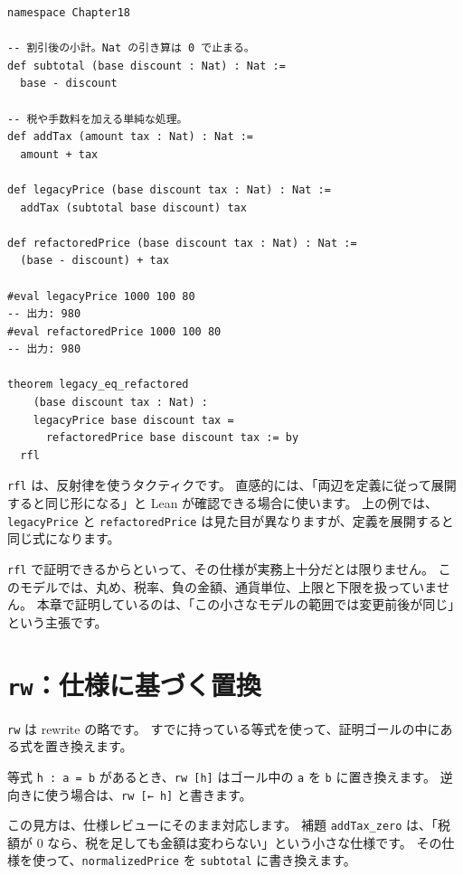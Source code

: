 \begin{listing}[htbp]
\begin{verbatim}
namespace Chapter18

-- 割引後の小計。Nat の引き算は 0 で止まる。
def subtotal (base discount : Nat) : Nat :=
  base - discount

-- 税や手数料を加える単純な処理。
def addTax (amount tax : Nat) : Nat :=
  amount + tax

def legacyPrice (base discount tax : Nat) : Nat :=
  addTax (subtotal base discount) tax

def refactoredPrice (base discount tax : Nat) : Nat :=
  (base - discount) + tax

#eval legacyPrice 1000 100 80
-- 出力: 980
#eval refactoredPrice 1000 100 80
-- 出力: 980

theorem legacy_eq_refactored
    (base discount tax : Nat) :
    legacyPrice base discount tax =
      refactoredPrice base discount tax := by
  rfl
\end{verbatim}
\caption{\texttt{legacyPrice\_eq\_refactored}}
\label{lst:ch18-price-model}
\end{listing}

\texttt{rfl} は、反射律を使うタクティクです。
直感的には、「両辺を定義に従って展開すると同じ形になる」と Lean が確認できる場合に使います。
上の例では、\texttt{legacyPrice} と \texttt{refactoredPrice} は見た目が異なりますが、定義を展開すると同じ式になります。

\texttt{rfl} で証明できるからといって、その仕様が実務上十分だとは限りません。
このモデルでは、丸め、税率、負の金額、通貨単位、上限と下限を扱っていません。
本章で証明しているのは、「この小さなモデルの範囲では変更前後が同じ」という主張です。

\section{\texttt{rw}：仕様に基づく置換}

\texttt{rw} は rewrite の略です。
すでに持っている等式を使って、証明ゴールの中にある式を置き換えます。

等式 \texttt{h : a = b} があるとき、\texttt{rw [h]} はゴール中の \texttt{a} を \texttt{b} に置き換えます。
逆向きに使う場合は、\texttt{rw [← h]} と書きます。

この見方は、仕様レビューにそのまま対応します。
補題 \texttt{addTax\_zero} は、「税額が 0 なら、税を足しても金額は変わらない」という小さな仕様です。
その仕様を使って、\texttt{normalizedPrice} を \texttt{subtotal} に書き換えます。

